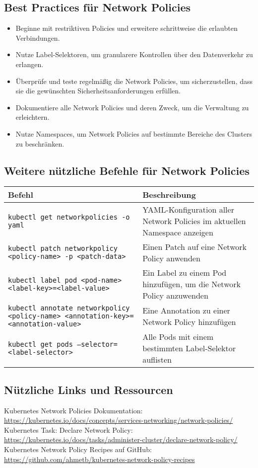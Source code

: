 \subsection{Best Practices für Network Policies}
\begin{itemize}
    \item Beginne mit restriktiven Policies und erweitere schrittweise die erlaubten Verbindungen.
    \item Nutze Label-Selektoren, um granularere Kontrollen über den Datenverkehr zu erlangen.
    \item Überprüfe und teste regelmäßig die Network Policies, um sicherzustellen, dass sie die gewünschten Sicherheitsanforderungen erfüllen.
    \item Dokumentiere alle Network Policies und deren Zweck, um die Verwaltung zu erleichtern.
    \item Nutze Namespaces, um Network Policies auf bestimmte Bereiche des Clusters zu beschränken.
\end{itemize}

\subsection{Weitere nützliche Befehle für Network Policies}
\begin{tabular}{|p{}|p{}|}
\hline
\textbf{Befehl} & \textbf{Beschreibung} \\
\hline
\texttt{kubectl get networkpolicies -o yaml} & YAML-Konfiguration aller Network Policies im aktuellen Namespace anzeigen \\
\texttt{kubectl patch networkpolicy <policy-name> -p <patch-data>} & Einen Patch auf eine Network Policy anwenden \\
\texttt{kubectl label pod <pod-name> <label-key>=<label-value>} & Ein Label zu einem Pod hinzufügen, um die Network Policy anzuwenden \\
\texttt{kubectl annotate networkpolicy <policy-name> <annotation-key>=<annotation-value>} & Eine Annotation zu einer Network Policy hinzufügen \\
\texttt{kubectl get pods --selector=<label-selector>} & Alle Pods mit einem bestimmten Label-Selektor auflisten \\
\hline
\end{tabular}

\subsection{Nützliche Links und Ressourcen}
Kubernetes Network Policies Dokumentation:\\
\url{https://kubernetes.io/docs/concepts/services-networking/network-policies/}\\
Kubernetes Task: Declare Network Policy:\\
\url{https://kubernetes.io/docs/tasks/administer-cluster/declare-network-policy/}\\
Kubernetes Network Policy Recipes auf GitHub:\\
\url{https://github.com/ahmetb/kubernetes-network-policy-recipes}\\